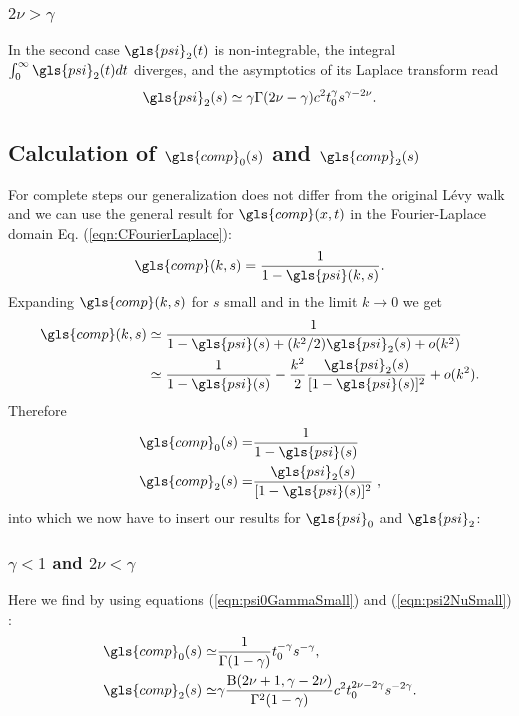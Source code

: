 \subsubsection*{$2\nu>\gamma$} 
In the second case $\gls{psi}_2(t)$ is non-integrable, the integral $\int_0^\infty \gls{psi}_2(t) dt$ diverges, and the asymptotics of its Laplace transform read
\begin{align}
 \gls{psi}_2(s) \simeq \gamma \Gamma(2\nu-\gamma) c^2  t_0^\gamma s^{\gamma-2\nu}. \label{eqn:psi2NuBig}
\end{align}

\subsection*{Calculation of $\gls{comp}_0(s)$ and $\gls{comp}_2(s)$}

For complete steps our generalization does not differ from the original L\'evy walk and we can use the general result for $\gls{comp}(x,t)$ in the Fourier-Laplace domain Eq. (\ref{eqn:CFourierLaplace}):
%
\begin{align}
\gls{comp}(k,s) = \frac{1}{1 - \gls{psi}(k,s)}.
\end{align}
%
Expanding $\gls{comp}(k,s)$ for $s$ small and in the limit $k \to 0$ we get 
%
\begin{align}
\begin{split}
\gls{comp}(k,s)  &\simeq \frac{1}{1 - \gls{psi}(s) + (k^2/2) \gls{psi}_2(s) +o(k^2)}\\ &\simeq \frac{1}{1-\gls{psi}(s)} - \frac{k^2}{2}  \frac{\gls{psi}_2(s)}{[1-\gls{psi}(s)]^2} + o(k^2).
\end{split}
\end{align}
Therefore 
\begin{align}
\gls{comp}_0(s) =& \frac{1}{1-\gls{psi}(s)}\\
\gls{comp}_2(s) =& \frac{\gls{psi}_2(s)}{[1-\gls{psi}(s)]^2} \;,
\end{align}
into which we now have to insert our results for $\gls{psi}_0$ and $\gls{psi}_2$:

\subsubsection{$\gamma<1$ and $2\nu<\gamma$ }
Here we find by using equations (\ref{eqn:psi0GammaSmall}) and (\ref{eqn:psi2NuSmall}) :
\begin{align}
 \gls{comp}_0(s) \simeq & \frac{1}{\Gamma(1-\gamma)} t_0^{-\gamma} s^{-\gamma}, \label{eq:Co}\\
 \gls{comp}_2(s) \simeq & \gamma   \frac{ \mathrm{B}(2\nu+1,\gamma-2\nu)}{\Gamma^2(1-\gamma)} c^2 t_0^{2\nu - 2\gamma} s^{-2 \gamma} .
\end{align}

